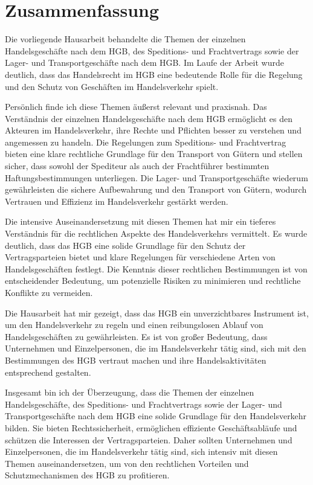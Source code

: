 \chapter{Zusammenfassung}

Die vorliegende Hausarbeit behandelte die Themen der einzelnen Handelsgeschäfte nach dem HGB, des Speditions- und Frachtvertrags sowie der Lager- und Transportgeschäfte nach dem HGB. Im Laufe der Arbeit wurde deutlich, dass das Handelsrecht im HGB eine bedeutende Rolle für die Regelung und den Schutz von Geschäften im Handelsverkehr spielt.

Persönlich finde ich diese Themen äußerst relevant und praxisnah. Das Verständnis der einzelnen Handelsgeschäfte nach dem HGB ermöglicht es den Akteuren im Handelsverkehr, ihre Rechte und Pflichten besser zu verstehen und angemessen zu handeln. Die Regelungen zum Speditions- und Frachtvertrag bieten eine klare rechtliche Grundlage für den Transport von Gütern und stellen sicher, dass sowohl der Spediteur als auch der Frachtführer bestimmten Haftungsbestimmungen unterliegen. Die Lager- und Transportgeschäfte wiederum gewährleisten die sichere Aufbewahrung und den Transport von Gütern, wodurch Vertrauen und Effizienz im Handelsverkehr gestärkt werden.

Die intensive Auseinandersetzung mit diesen Themen hat mir ein tieferes Verständnis für die rechtlichen Aspekte des Handelsverkehrs vermittelt. Es wurde deutlich, dass das HGB eine solide Grundlage für den Schutz der Vertragsparteien bietet und klare Regelungen für verschiedene Arten von Handelsgeschäften festlegt. Die Kenntnis dieser rechtlichen Bestimmungen ist von entscheidender Bedeutung, um potenzielle Risiken zu minimieren und rechtliche Konflikte zu vermeiden.

Die Hausarbeit hat mir gezeigt, dass das HGB ein unverzichtbares Instrument ist, um den Handelsverkehr zu regeln und einen reibungslosen Ablauf von Handelsgeschäften zu gewährleisten. Es ist von großer Bedeutung, dass Unternehmen und Einzelpersonen, die im Handelsverkehr tätig sind, sich mit den Bestimmungen des HGB vertraut machen und ihre Handelsaktivitäten entsprechend gestalten.

Insgesamt bin ich der Überzeugung, dass die Themen der einzelnen Handelsgeschäfte, des Speditions- und Frachtvertrags sowie der Lager- und Transportgeschäfte nach dem HGB eine solide Grundlage für den Handelsverkehr bilden. Sie bieten Rechtssicherheit, ermöglichen effiziente Geschäftsabläufe und schützen die Interessen der Vertragsparteien. Daher sollten Unternehmen und Einzelpersonen, die im Handelsverkehr tätig sind, sich intensiv mit diesen Themen auseinandersetzen, um von den rechtlichen Vorteilen und Schutzmechanismen des HGB zu profitieren.


